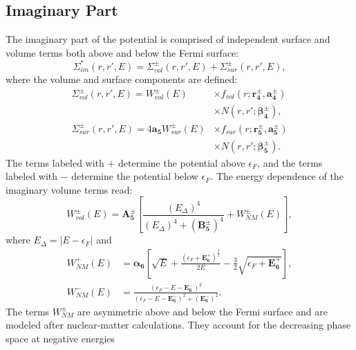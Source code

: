 \documentclass[twocolumn,secnumarabic,amssymb, nobibnotes, aps, prl,
superscriptaddress, nobalancelastpage]{revtex4}
\begin{document}
\subsection{Imaginary Part}
The imaginary part of the potential is comprised of independent surface and volume terms
both above and below the Fermi surface:
\begin{equation}
    \Sigma_{im}^{*}(r,r',E) =
    \Sigma_{vol}^{\pm}(r,r',E)
    + \Sigma_{sur}^{\pm}(r,r',E),
\end{equation}
where the volume and surface components are defined:
\begin{equation}
    \begin{split}
        \Sigma_{vol}^{\pm}(r,r',E)
        = W_{vol}^{\pm}(E) & {\times}f_{vol}(r; \mathbf{r_{4}^{\pm}},
        \mathbf{a_{4}^{\pm}})\\
        & {\times}N(r,r'; \boldsymbol{\beta_{4}^{\pm}}),\\
        \Sigma_{sur}^{\pm}(r,r',E)
        = 4\mathbf{a_{5}}W_{sur}^{\pm}(E) & {\times}f_{sur}(r;
        \mathbf{r_{5}^{\pm}}, \mathbf{a_{5}^{\pm}})\\
        & {\times} N(r,r';\boldsymbol{\beta_{5}^{\pm}}).
    \end{split}
\end{equation}
The terms labeled with $+$ determine the potential above $\epsilon_{F}$, and the terms labeled
with $-$ determine the potential below $\epsilon_{F}$.
The energy dependence of the imaginary volume terms read:
\begin{equation} \label{ImagVolume}
    W_{vol}^{\pm}(E) = \mathbf{A_{5}^{\pm}}\left[\frac{(E_{\Delta})^{4}}
    {(E_{\Delta})^{4}+(\mathbf{B_{5}^{\pm}})^{4}} + W_{NM}^{\pm}(E)\right],
\end{equation}
where $E_{\Delta} = |E-\epsilon_{F}|$ and
\begin{equation}
    \begin{split}
        W_{NM}^{+}(E) & = {\boldsymbol{\alpha_{6}}}\left[\sqrt{E} +
            \frac{(\epsilon_{F}+\mathbf{E^{+}_{6}})^{\frac{3}{2}}}{2E}
        -\frac{3}{2}\sqrt{\epsilon_{F}+\mathbf{E^{+}_{6}}}\right],\\
        W_{NM}^{-}(E) & = \frac{(\epsilon_{F}-E-\mathbf{E_{6}^{-}})^{2}}
        {(\epsilon_{F}-E-\mathbf{E_{6}^{-}})^{2}+(\mathbf{E_{6}^{-}})^{2}}.
        \end{split}
    \end{equation}
The terms $W_{NM}^{\pm}$ are asymmetric above and below the Fermi surface and are modeled after
nuclear-matter calculations. They account for the decreasing phase space at negative energies
\end{document}
